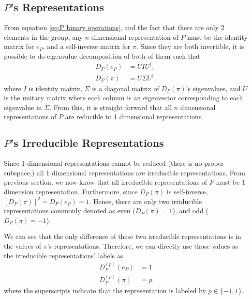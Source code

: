 \documentclass[preprint, 12pt]{revtex4-2}
\numberwithin{equation}{section}
\begin{document}
\subsection{$P$'s Representations}
From equation \ref{eq:P binary operations}, and the fact that there are only 2 elements in the group, any $n$ dimensional representation of $P$ must be the identity matrix for $e_P$, and a self-inverse matrix for $\pi$. Since they are both invertible, it is possible to do eigenvalue decomposition of both of them such that
\begin{equation}\label{eq:P eigen decompose}
    \begin{aligned}
        D_P(e_P) &= UIU^\dagger, \\
        D_P(\pi) &= U\Sigma U^\dagger.
    \end{aligned}
\end{equation}
where $I$ is identity matrix, $\Sigma$ is a diagonal matrix of $D_P(\pi)$'s eigenvalues, and $U$ is the unitary matrix where each column is an eigenvector corresponding to each eigenvalue in $\Sigma$. From this, it is straight forward that all $n$ dimensional representations of $P$ are reducible to 1 dimensional representations.

\subsection{$P$'s Irreducible Representations}
Since 1 dimensional representations cannot be reduced (there is no proper subspace,) all 1 dimensional representations are irreducible representations. From previous section, we now know that all irreducible representations of $P$ must be 1 dimension representation. Furthermore, since $D_P(\pi)$ is self-inverse, $[D_P(\pi)]^2= D_P(e_P)=1$. Hence, there are only two irriducible representations commonly denoted as even ($D_P(\pi)= 1$), and odd ($D_P(\pi)=-1$). 

We can see that the only difference of these two irreducible representations is in the values of $\pi$'s representations. Therefore, we can directly use those values as the irreducible representations' labels as
\begin{equation}\label{eq:P Irreps}
    \begin{aligned}
        D_P^{(p)}(e_P) &= 1 \\
        D_P^{(p)}(\pi) &= p
    \end{aligned}
\end{equation}
where the superscripts indicate that the representation is labeled by $p\in \{-1, 1\}$.
\end{document}
